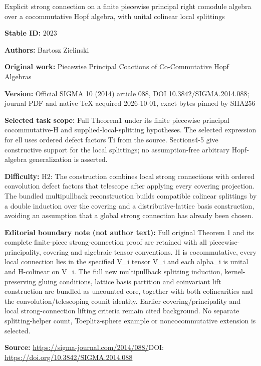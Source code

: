 \documentclass[11pt]{article}
\begin{document}
\begin{center}\Large Explicit strong connection on a finite piecewise principal right comodule algebra over a cocommutative Hopf algebra, with unital colinear local splittings\end{center}
\noindent\textbf{Stable ID:} 2023\par
\noindent\textbf{Authors:} Bartosz Zielinski\par
\noindent\textbf{Original work:} Piecewise Principal Coactions of Co-Commutative Hopf Algebras\par
\noindent\textbf{Version:} Official SIGMA 10 (2014) article 088, DOI 10.3842/SIGMA.2014.088; journal PDF and native TeX acquired 2026-10-01, exact bytes pinned by SHA256\par
\noindent\textbf{Selected task scope:} Full Theorem1 under its finite piecewise principal cocommutative-H and supplied-local-splitting hypotheses. The selected expression for ell uses ordered defect factors Ti from the source. Sections4-5 give constructive support for the local splittings; no assumption-free arbitrary Hopf-algebra generalization is asserted.\par
\noindent\textbf{Difficulty:} H2: The construction combines local strong connections with ordered convolution defect factors that telescope after applying every covering projection. The bundled multipullback reconstruction builds compatible colinear splittings by a double induction over the covering and a distributive-lattice basis construction, avoiding an assumption that a global strong connection has already been chosen.\par
\noindent\textbf{Editorial boundary note (not author text):} Full original Theorem 1 and its complete finite-piece strong-connection proof are retained with all piecewise-principality, covering and algebraic tensor conventions. H is cocommutative, every local connection lies in the specified V\_i tensor V\_i and each alpha\_i is unital and H-colinear on V\_i. The full new multipullback splitting induction, kernel-preserving gluing conditions, lattice basis partition and coinvariant lift construction are bundled as uncounted core, together with both colinearities and the convolution/telescoping counit identity. Earlier covering/principality and local strong-connection lifting criteria remain cited background. No separate splitting-helper count, Toeplitz-sphere example or noncocommutative extension is selected.\par
\noindent\textbf{Source:} \url{https://sigma-journal.com/2014/088/}\quad DOI: \url{https://doi.org/10.3842/SIGMA.2014.088}\par
\end{document}
